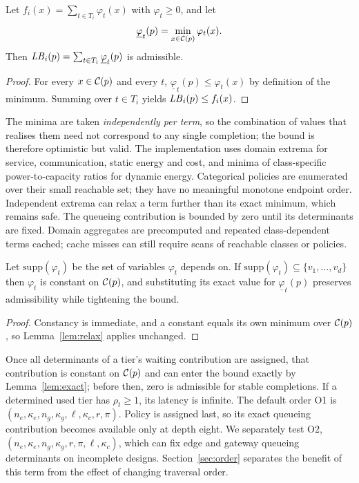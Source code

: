 \begin{lemma}
\label{lem:relax}
Let $f_i(x)=\sum_{t\in T_i}\varphi_t(x)$ with $\varphi_t\ge0$, and let
\begin{equation*}
\underline{\varphi}_t(p)=\min_{x\in\mathcal{C}(p)}\varphi_t(x).
\end{equation*}
Then $\mathit{LB}_i(p)=\sum_{t\in T_i}\underline{\varphi}_t(p)$ is admissible.
\end{lemma}
\begin{proof}
For every $x\in\mathcal{C}(p)$ and every $t$, $\underline{\varphi}_t(p)\le\varphi_t(x)$ by
definition of the minimum. Summing over $t\in T_i$ yields $\mathit{LB}_i(p)\le f_i(x)$.
\end{proof}

The minima are taken \emph{independently per term}, so the combination of values that
realises them need not correspond to any single completion; the bound is therefore
optimistic but valid. The implementation uses domain extrema for service, communication,
static energy and cost, and minima of class-specific power-to-capacity ratios
for dynamic energy. Categorical policies are enumerated over their small
reachable set; they have no meaningful monotone endpoint order. Independent
extrema can relax a term further than its exact minimum, which remains safe.
The queueing contribution is bounded by zero until its determinants are fixed.
Domain aggregates are precomputed and repeated class-dependent terms cached;
cache misses can still require scans of reachable classes or policies.

\begin{lemma}
\label{lem:exact}
Let $\mathrm{supp}(\varphi_t)$ be the set of variables $\varphi_t$ depends on. If
$\mathrm{supp}(\varphi_t)\subseteq\{v_1,\dots,v_d\}$ then $\varphi_t$ is constant on
$\mathcal{C}(p)$, and substituting its exact value for $\underline{\varphi}_t(p)$ preserves
admissibility while tightening the bound.
\end{lemma}
\begin{proof}
Constancy is immediate, and a constant equals its own minimum over $\mathcal{C}(p)$, so
Lemma~\ref{lem:relax} applies unchanged.
\end{proof}

\begin{remark}
\label{rem:order}
Once all determinants of a tier's waiting contribution are assigned,
that contribution is constant on $\mathcal{C}(p)$ and can enter the bound exactly by
Lemma~\ref{lem:exact}; before then, zero is admissible for stable completions.
If a determined used tier has $\rho_t\ge1$, its latency is infinite.
The default order O1 is $(n_e,\kappa_e,n_g,\kappa_g,\ell,\kappa_c,r,\pi)$.
Policy is assigned last, so its exact queueing contribution becomes available only at
depth eight. We separately test O2,
$(n_e,\kappa_e,n_g,\kappa_g,r,\pi,\ell,\kappa_c)$, which can fix edge and gateway
queueing determinants on incomplete designs. Section~\ref{sec:order} separates the
benefit of this term from the effect of changing traversal order.
\end{remark}

